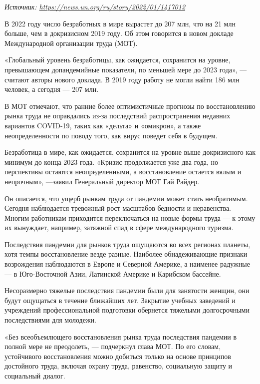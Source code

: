 \textit{Источник: \url{https://news.un.org/ru/story/2022/01/1417012}}

\begin{fancyquotes}
    В 2022 году число безработных в мире вырастет до 207 млн, что на 21 млн больше, чем в докризисном 2019 году. Об этом говорится в новом докладе Международной организации труда (МОТ).
\end{fancyquotes}

«Глобальный уровень безработицы, как ожидается, сохранится на уровне, превышающем допандемийные показатели, по меньшей мере до 2023 года», — считают авторы нового доклада. В 2019 году работу не могли найти 186 млн человек, а сегодня — 207 млн.


В МОТ отмечают, что ранние более оптимистичные прогнозы по восстановлению рынка труда не оправдались из-за последствий распространения недавних вариантов COVID-19, таких как «дельта» и «омикрон», а также неопределенности по поводу того, как вирус поведет себя в будущем.

Безработица в мире, как ожидается, сохранится на уровне выше докризисного как минимум до конца 2023 года. «Кризис продолжается уже два года, но перспективы остаются неопределенными, а восстановление остается вялым и непрочным», —заявил Генеральный директор МОТ Гай Райдер.

Он опасается, что ущерб рынкам труда от пандемии может стать необратимым. Сегодня наблюдается тревожный рост масштабов бедности и неравенства. Многим работникам приходится переключаться на новые формы труда — к этому их вынуждает, например, затяжной спад в сфере международного туризма.

Последствия пандемии для рынков труда ощущаются во всех регионах планеты, хотя темпы восстановление везде разные. Наиболее обнадеживающие признаки возрождения наблюдаются в Европе и Северной Америке, а наименее радужные — в Юго-Восточной Азии, Латинской Америке и Карибском бассейне.

Несоразмерно тяжелые последствия пандемии были для занятости женщин, они будут ощущаться в течение ближайших лет. Закрытие учебных заведений и учреждений профессиональной подготовки обернется тяжелыми долгосрочными последствиями для молодежи.

«Без всеобъемлющего восстановления рынка труда последствия пандемии в полной мере не преодолеть, — подчеркнул глава МОТ. По его словам, устойчивого восстановления можно добиться только на основе принципов достойного труда, включая охрану труда, равенство, социальную защиту и социальный диалог.

